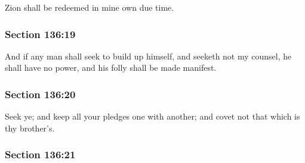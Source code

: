 		Zion shall be redeemed in mine own due time.


	\subsubsection{Section 136:19} %
		\label{DC136-19}

		And if any man shall seek to build up himself, and seeketh not my counsel, he shall have no power, and his folly shall be made manifest.


	\subsubsection{Section 136:20} %
		\label{DC136-20}

		Seek ye; and keep all your pledges one with another; and covet not that which is thy brother's.


	\subsubsection{Section 136:21} %
		\label{DC136-21}

